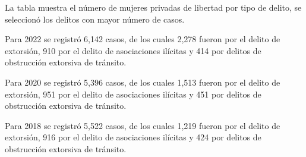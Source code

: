 La tabla muestra el número de mujeres privadas de libertad por tipo de delito, se seleccionó los delitos con mayor número de casos. 

Para 2022 se registró 6,142 casos, de los cuales 2,278 fueron por el delito de extorsión, 910 por el delito de asociaciones ilícitas y 414 por delitos de obstrucción extorsiva de tránsito.

Para 2020 se registró 5,396 casos, de los cuales 1,513 fueron por el delito de extorsión, 951 por el delito de asociaciones ilícitas y 451 por delitos de obstrucción extorsiva de tránsito.

Para 2018 se registró 5,522 casos, de los cuales 1,219 fueron por el delito de extorsión, 916 por el delito de asociaciones ilícitas y 424 por delitos de obstrucción extorsiva de tránsito.